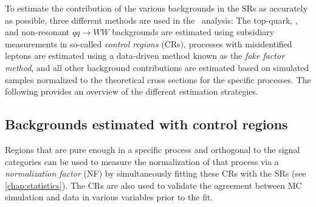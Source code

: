To estimate the contribution of the various backgrounds in the SRs as accurately as possible, three different methods are used in the \HWW\ analysis:
The top-quark, \Zgamma, and non-resonant $qq \to WW$ backgrounds are estimated using subsidiary measurements in so-called \emph{control regions} (CRs), processes with misidentified leptons are estimated using a data-driven method known as the \emph{fake factor method}, and all other background contributions are estimated based on simulated samples normalized to the theoretical cross sections for the specific processes.
The following provides an overview of the different estimation strategies.

\subsection{Backgrounds estimated with control regions}
Regions that are pure enough in a specific process and orthogonal to the signal categories can be used to measure the normalization of that process via a \emph{normalization factor} (NF) by simultaneously fitting these CRs with the SRs (see \cref{chap:statistics}).
The CRs are also used to validate the agreement between MC simulation and data in various variables prior to the fit.

